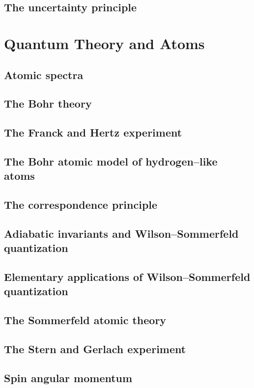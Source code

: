 \documentclass{article}
\begin{document}
\subsection{The uncertainty principle}

\section{Quantum Theory and Atoms}
\subsection{Atomic spectra}
\subsection{The Bohr theory}
\subsection{The Franck and Hertz experiment}
\subsection{The Bohr atomic model of hydrogen–like atoms}
\subsection{The correspondence principle}
\subsection{Adiabatic invariants and Wilson–Sommerfeld quantization}
\subsection{Elementary applications of Wilson–Sommerfeld quantization}
\subsection{The Sommerfeld atomic theory}
\subsection{The Stern and Gerlach experiment}
\subsection{Spin angular momentum}
\end{document}
